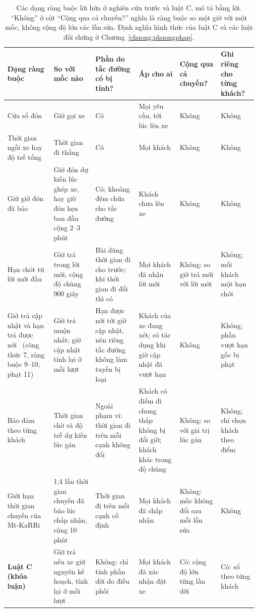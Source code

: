 \begin{table}[htbp]
\centering
\caption{Các dạng ràng buộc lời hứa ở nghiên cứu trước và luật C, mô tả bằng lời. ``Không'' ở cột ``Cộng qua cả
chuyến?'' nghĩa là ràng buộc so một giờ với một mốc, không cộng độ lớn các lần sửa. Định nghĩa hình thức của luật C và
các luật đối chứng ở Chương~\ref{chuong:phuongphap}.}
\label{bang:c2-dangrangbuoc}
\footnotesize
\setlength{\tabcolsep}{3pt}
\begin{tabular}{@{}p{2.7cm}p{2.6cm}p{2.5cm}p{2.5cm}p{2.3cm}p{2.3cm}@{}}
\toprule
\textbf{Dạng ràng buộc} & \textbf{So với mốc nào} & \textbf{Phần do tắc đường có bị tính?} & \textbf{Áp cho ai} &
\textbf{Cộng qua cả chuyến?} & \textbf{Ghi riêng cho từng khách?}\\
\midrule
Cửa sổ đón~\cite{alonsomora2017} & Giờ gọi xe & Có & Mọi yêu cầu, tới lúc lên xe & Không & Không\\
Thời gian ngồi xe hay độ trễ tổng~\cite{alonsomora2017,molenbruch2017} & Thời gian đi thẳng & Có & Mọi khách & Không
& Không\\
Giữ giờ đón đã báo~\cite{alonsomora2017,lu2024} & Giờ đón dự kiến lúc ghép xe, hay giờ đón hẹn ban đầu cộng 2--3
phút & Có; khoảng đệm chừa cho tắc đường & Khách chưa lên xe & Không & Không\\
Hạn chót từ lời mời đầu~\cite{schulz2026} & Giờ trả trong lời mời, cộng độ chùng 900 giây & Bài dùng thời gian đi cho
trước; khi thời gian đi đổi thì có & Mọi khách đã nhận lời mời & Không: so giờ trả mới với lời mời & Không; mỗi khách
một hạn chót\\
Giờ trả cập nhật và hạn trả được nới~\cite{horl2022} (công thức 7, ràng buộc 9--10, phạt 11) & Giờ trả muộn nhất;
giờ cập nhật tính lại ở mỗi lượt & Hạn được nới tới giờ cập nhật, nên riêng tắc đường không làm tuyến bị loại & Khách
của xe đang xét; có tác dụng khi giờ cập nhật đã vượt hạn & Không & Không; phần vượt hạn gốc bị phạt\\
Bảo đảm theo từng khách~\cite{elmi2026} & Thời gian chờ và độ trễ dự kiến lúc gán & Ngoài phạm vi: thời gian đi trên
mỗi cạnh không đổi & Khách có điểm đi chung thấp không bị đổi giờ; khách khác trong độ chùng & Không: so với giá trị
lúc gán & Không; chỉ chọn khách theo điểm\\
Giới hạn thời gian chuyến của Mt-KaRRi~\cite{laupichler2026} & 1,4 lần thời gian chuyến đã báo lúc chấp nhận, cộng
10 phút & Thời gian đi trên mỗi cạnh cố định & Mọi khách đã chấp nhận & Không: mốc không đổi sau mỗi lần sửa & Không\\
\textbf{Luật C (khóa luận)} & Giờ trả nếu xe giữ nguyên kế hoạch, tính lại ở mỗi lượt & Không: chỉ tính phần dời do
điều phối & Mọi khách đã xác nhận đặt xe & Có: cộng độ lớn từng lần dời & Có: sổ theo từng khách\\
\bottomrule
\end{tabular}
\end{table}

